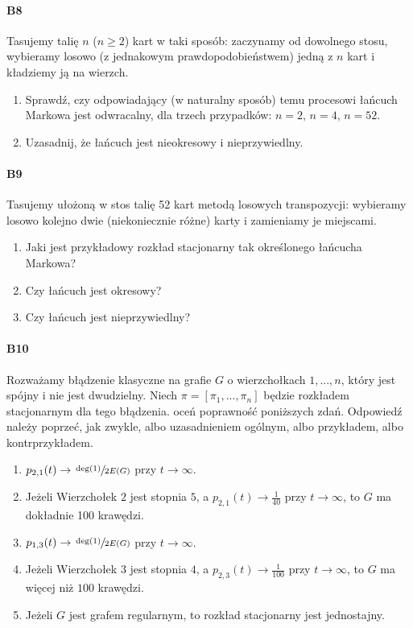 \documentclass[a4paper,12pt]{article}
\theoremstyle{definition}%
\theoremstyle{definition}
\theoremstyle{problem}
\begin{document}
\paragraph{B8} Tasujemy talię $n$ ($n \geq 2$) kart w taki sposób: zaczynamy od dowolnego stosu, wybieramy losowo (z jednakowym prawdopodobieństwem) jedną
z $n$ kart i kładziemy ją na wierzch.
\begin{enumerate}[label=\alph*)]
\item Sprawdź, czy odpowiadający (w naturalny sposób) temu procesowi łańcuch Markowa jest odwracalny, dla trzech przypadków: $n = 2$, $n = 4$, $n = 52$.
\item Uzasadnij, że łańcuch jest nieokresowy i nieprzywiedlny.
\end{enumerate}

\paragraph{B9} Tasujemy ułożoną w stos talię 52 kart metodą losowych transpozycji: wybieramy losowo kolejno dwie (niekoniecznie różne) karty i zamieniamy je miejscami.
\begin{enumerate}[label=\alph*)]
\item Jaki jest przykładowy rozkład stacjonarny tak określonego łańcucha Markowa?
\item Czy łańcuch jest okresowy?
\item Czy łańcuch jest nieprzywiedlny?
\end{enumerate}

\paragraph{B10} Rozważamy błądzenie klasyczne na grafie $G$ o wierzchołkach $1, . . . , n$, który jest spójny i nie jest dwudzielny. Niech $\pi = [\pi_1, . . . , \pi_n]$ będzie rozkładem stacjonarnym dla tego błądzenia. oceń poprawność poniższych zdań. Odpowiedź należy poprzeć, jak zwykle, albo uzasadnieniem ogólnym, albo przykładem, albo kontrprzykładem.
\begin{enumerate}[label=\alph*)]
\item $p_{2,1}(t) \rightarrow \sfrac{\deg(1)}{2E(G)}$ przy $t\to \infty$.
\item Jeżeli Wierzchołek $2$ jest stopnia $5$, a $p_{2,1}(t) \rightarrow \frac{1}{40}$ przy $t\to \infty$, to $G$ ma dokładnie 100 krawędzi.
\item $p_{1,3}(t) \rightarrow \sfrac{\deg(1)}{2E(G)}$ przy $t\to \infty$.
\item Jeżeli Wierzchołek $3$ jest stopnia $4$, a $p_{2,3}(t) \rightarrow \frac{1}{100}$ przy $t\to \infty$, to $G$ ma więcej niż $100$ krawędzi.
\item Jeżeli $G$ jest grafem regularnym, to rozkład stacjonarny jest jednostajny.
\end{enumerate}
\end{document}
